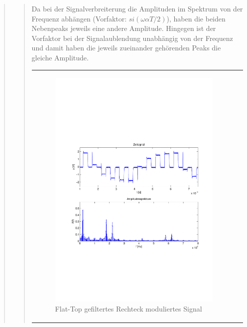 \begin{quote}
\begin{quote}
            Da bei der Signalverbreiterung die Amplituden im Spektrum von der Frequenz abhängen (Vorfaktor: $si(\omega
             \alpha T/2)$), haben die beiden Nebenpeaks jeweils eine andere Amplitude. Hingegen ist der Vorfaktor bei
             der Signalaublendung unabhängig von der Frequenz und damit haben die jeweils zueinander
             gehörenden Peaks die gleiche Amplitude.
      
      
      
      \begin{center}
            \begin{tabular}{ll}
            
            \hspace{-5cm}
                \begin{minipage}{0.6\textwidth}
                    \begin{figure}[H]
                        \includegraphics[scale=0.55, trim = 16mm 70mm 16mm 85mm, clip]{Bilder/flatrecFil20_05abget_zeit}
                          \caption{Flat-Top gefiltertes Rechteck moduliertes Signal}
		                  \label{fig:flatrecFil20_05zeit}
                    \end{figure}
                \end{minipage}
                

\end{tabular}
\end{center}
\end{quote}
\end{quote}
